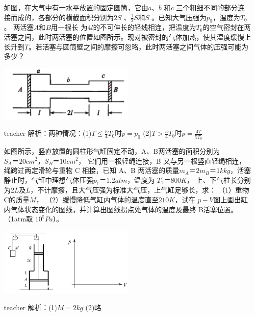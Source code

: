 \begin{example}
	如图，在大气中有一水平放置的固定圆筒，它由$ a$、$b$ 和$ c$ 三个粗细不同的部分连接而成的，各部分的横截面积分别为$ 2S$ 、$\frac{1}{2} S $和$S$ 。已知大气压强为$p_0$，温度为$T_0$。
	两活塞$A$和$B$用一根长
	为$4l$的不可伸长的轻线相连，把温度为$T_0$的空气密封在两活塞之间，此时两活塞的位置如图所示。现对被密封的气体加热，使其温度缓慢上长升到$T$。若活塞与圆筒壁之间的摩擦可忽略，此时两活塞之间气体的压强可能为多少？
		\begin{flushright}
			\includegraphics[width = 0.5\textwidth]{images/thermal-3.pdf} 
		\end{flushright}
	\begin{taggedblock}{teacher}
		\noindent
		解析：两种情况：(1)$T\leq\frac{5}{4}T_0$时$p=p_0$     (2)$T>\frac{5}{4}T_0$时$p=\frac{4T}{5T_0}$
	\end{taggedblock}
\end{example}


\begin{example}
	如图所示，竖直放置的圆柱形气缸固定不动，A、B两活塞的面积分别为 $S_A＝20 cm^2$，$S_B＝10 cm^2，$ 它们用一根轻绳连接，B 又与另一根竖直轻绳相连，绳跨过两定滑轮与重物 C 相接，已知 A、B 两活塞的质量$m_A＝2m _B＝1 k\si{kg}$，活塞静止时，气缸中理想气体压强$ p_1＝1.2 atm$，温度为 $T_1＝800 \si{K}$， 上、下气柱长分别为$ 2L $及$ L$，不计摩擦，且大气压强为标准大气压，上气缸足够长，求：
	（1）重物C的质量$M$， （2）缓慢降低气缸内气体的温度直至$ 210 K$，试在 $p-V$图上画出缸内气体状态变化的图线，并计算出图线拐点处气体的温度及最终 B活塞位置。 （1atm取 $10^5\si{Pa}$）。
		\begin{flushright}
			\includegraphics[width = 0.5\textwidth]{images/thermal-4.pdf} 
		\end{flushright}
	\begin{taggedblock}{teacher}
		\noindent
		解析：(1)$M=2kg$      (2)略
	\end{taggedblock}
\end{example}


